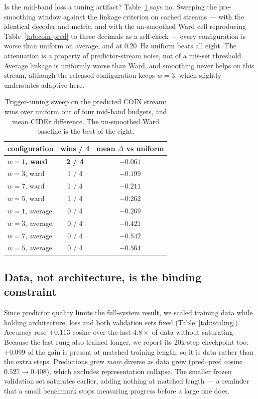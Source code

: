 \documentclass[journal]{IEEEtran}
\begin{document}
Is the mid-band loss a tuning artifact? Table~\ref{tab:tuning} says no. Sweeping
the pre-smoothing window against the linkage criterion on cached streams --- with
the identical decoder and metric, and with the un-smoothed Ward cell reproducing
Table~\ref{tab:coin-pred} to three decimals as a self-check --- every configuration
is worse than uniform on average, and at 0.20~Hz uniform beats all eight. The
attenuation is a property of predictor-stream noise, not of a mis-set threshold.
Average linkage is uniformly worse than Ward, and smoothing never helps on this
stream, although the released configuration keeps $w=3$, which slightly understates
adaptive here.

\begin{table}[t]
\caption{Trigger-tuning sweep on the predicted COIN stream: wins over uniform out
of four mid-band budgets, and mean CIDEr difference. The un-smoothed Ward baseline
is the best of the eight.}
\label{tab:tuning}
\centering
\footnotesize
\setlength{\tabcolsep}{6pt}
\begin{tabular}{lcc}
\toprule
configuration & wins / 4 & mean $\Delta$ vs uniform \\
\midrule
\textbf{$w=1$, ward} & \textbf{2 / 4} & \textbf{$-0.061$} \\
$w=3$, ward & 1 / 4 & $-0.199$ \\
$w=7$, ward & 1 / 4 & $-0.211$ \\
$w=5$, ward & 1 / 4 & $-0.262$ \\
$w=1$, average & 0 / 4 & $-0.269$ \\
$w=3$, average & 0 / 4 & $-0.421$ \\
$w=7$, average & 0 / 4 & $-0.542$ \\
$w=5$, average & 0 / 4 & $-0.564$ \\
\bottomrule
\end{tabular}
\end{table}

\subsection{Data, not architecture, is the binding constraint}
Since predictor quality limits the full-system result, we scaled training data
while holding architecture, loss and both validation sets fixed
(Table~\ref{tab:scaling}). Accuracy rose $+0.113$ cosine over the last
$4.8\times$ of data without saturating. Because the last rung also trained longer,
we report its 20k-step checkpoint too: $+0.099$ of the gain is present at matched
training length, so it is data rather than the extra steps. Predictions grew
\emph{more} diverse as data grew (pred--pred cosine $0.527 \rightarrow 0.408$),
which excludes representation collapse. The smaller frozen validation set
saturates earlier, adding nothing at matched length --- a reminder that a small
benchmark stops measuring progress before a large one does.
\end{document}
